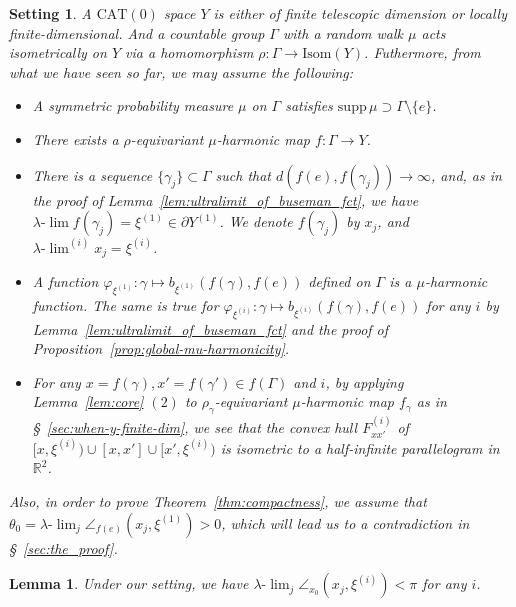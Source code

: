\documentclass[12pt]{amsart}
\numberwithin{equation}{section}
\theoremstyle{plain}
\newtheorem{Lemma}[Theorem]{Lemma}
\newtheorem*{Setting}{Setting}
\theoremstyle{definition}
\theoremstyle{remark}
\newcommand{\R}{{\mathbb R}}
\newcommand{\isom}[1]{\mathrm{Isom}({#1})}
\newcommand{\cat}[1]{\mathrm{CAT}(#1)}
\newcommand{\uulim}[1][]{\lambda{\text{-}}\!{\lim}^{(#1)}}
\newcommand{\ulim}{\lambda{\text{-}}\!\lim}
\newcommand{\xxi}[1]{\xi^{(#1)}}
\newcommand{\ray}[1]{[#1)}
\newcommand{\zure}{\theta_0}
\newcommand{\supp}{\mathrm{supp}\,}
\begin{document}
%
%
\begin{Setting}
 \label{setting}
 A $\cat{0}$ space $Y$ is either of finite telescopic dimension
 or locally finite-dimensional. 
 And a countable group $\Gamma$ with a random walk $\mu$ acts
 isometrically on $Y$ via a homomorphism
 $\rho\colon\Gamma \rightarrow \isom{Y}$.  
 Futhermore, from what we have seen so far, we may assume the following: 
 \begin{itemize}
 \item  A symmetric probability measure $\mu$ on $\Gamma$ satisfies
	$\supp \mu \supset \Gamma \setminus \{e\}$. 
 \item  There exists a $\rho$-equivariant
	$\mu$-harmonic map $f \colon \Gamma \rightarrow Y$. 
 \item  There is a sequence $\{\gamma_j\}\subset \Gamma$ such that
	$d(f(e),f(\gamma_j))\to \infty$, 
	and, as in the proof of
	Lemma~\ref{lem:ultralimit_of_buseman_fct}, we have 
	$\ulim f(\gamma_j)= \xxi{1} \in \partial Y^{(1)}$. 
	We denote $f(\gamma_j)$ by $x_j$, and $\uulim[i]x_j=\xxi{i}$. 
 \item  A function 
        $\varphi_{\xxi{1}}\colon \gamma \mapsto
	b_{\xxi{1}}(f(\gamma),f(e))$ 
	defined on $\Gamma$ is a $\mu$-harmonic function. 
	The same is true for 
        $\varphi_{\xxi{i}}\colon \gamma \mapsto
	b_{\xxi{i}}(f(\gamma),f(e))$ 
	for any $i$ by Lemma~\ref{lem:ultralimit_of_buseman_fct} and
        the proof of Proposition~\ref{prop:global-mu-harmonicity}.
 \item  For any $x=f(\gamma), x'=f(\gamma') \in f(\Gamma)$ and $i$, 
	by applying Lemma~\ref{lem:core} $(2)$ to
	$\rho_{\gamma}$-equivariant $\mu$-harmonic map $f_{\gamma}$ as
	in \S~\ref{sec:when-y-finite-dim}, 
        we see that the convex hull $F_{xx'}^{(i)}$ of 
	$\ray{x,\xxi{i}}\cup [x,x']\cup \ray{x',\xxi{i}}$
	is isometric to a half-infinite parallelogram in $\R^2$.
 \end{itemize}
 Also, in order to prove Theorem~\ref{thm:compactness}, we assume that
 $\zure=\ulim_j \angle_{f(e)}(x_j,\xxi{1})>0$, which will lead us to a
 contradiction in \S~\ref{sec:the_proof}.  
\end{Setting}

%
% 
\begin{Lemma}
\label{lem:zure<pi} 
 Under our setting, we have 
 $\ulim_j \angle_{x_0} (x_j,\xxi{i})< \pi$ for any $i$. 
\end{Lemma} 
\end{document}
